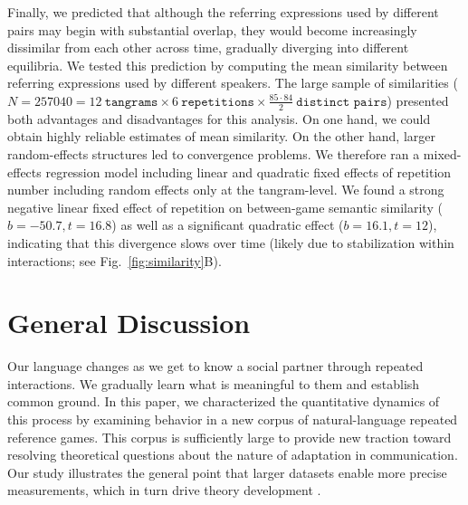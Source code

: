 \documentclass[alpha-refs]{wiley-article}
\begin{document}
Finally, we predicted that although the referring expressions used by different pairs may begin with substantial overlap, they would become increasingly dissimilar from each other across time, gradually diverging into different equilibria.
We tested this prediction by computing the mean similarity between referring expressions used by different speakers.
The large sample of similarities ($N = 257040 = 12~\texttt{tangrams} \times 6~\texttt{repetitions} \times \frac{85 \cdot 84}{2}~\texttt{distinct pairs}$) presented both advantages and disadvantages for this analysis.
On one hand, we could obtain highly reliable estimates of mean similarity.
On the other hand, larger random-effects structures led to convergence problems.
We therefore ran a mixed-effects regression model including linear and quadratic fixed effects of repetition number including random effects only at the tangram-level.
We found a strong negative linear fixed effect of repetition on between-game semantic similarity ($b = -50.7, t= 16.8$) as well as a significant quadratic effect ($b= 16.1, t = 12$), indicating that this divergence slows over time (likely due to stabilization within interactions; see Fig.~\ref{fig:similarity}B).



\section{General Discussion}
\label{sec:discussion}

Our language changes as we get to know a social partner through repeated interactions.
We gradually learn what is meaningful to them and establish common ground.
In this paper, we characterized the quantitative dynamics of this process by examining behavior in a new corpus of natural-language repeated reference games.
This corpus is sufficiently large to provide new traction toward resolving theoretical questions about the nature of adaptation in communication. Our study illustrates the general point that larger datasets enable more precise measurements, which in turn drive theory development \citep{frank2018great}.
\end{document}

